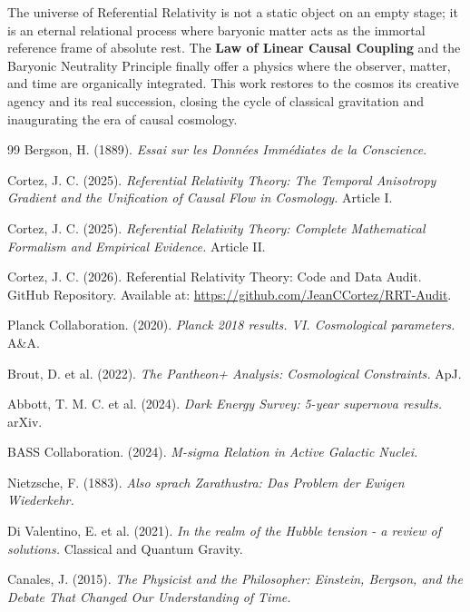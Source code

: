 \documentclass[12pt, a4paper]{article}
\begin{document}
The universe of Referential Relativity is not a static object on an empty stage; it is an eternal relational process where baryonic matter acts as the immortal reference frame of absolute rest. The \textbf{Law of Linear Causal Coupling} and the Baryonic Neutrality Principle finally offer a physics where the observer, matter, and time are organically integrated. This work restores to the cosmos its creative agency and its real succession, closing the cycle of classical gravitation and inaugurating the era of causal cosmology.

\begin{thebibliography}{99}
Bergson, H. (1889). \textit{Essai sur les Données Immédiates de la Conscience}.

Cortez, J. C. (2025). \textit{Referential Relativity Theory: The Temporal Anisotropy Gradient and the Unification of Causal Flow in Cosmology.} Article I.

Cortez, J. C. (2025). \textit{Referential Relativity Theory: Complete Mathematical Formalism and Empirical Evidence.} Article II.

Cortez, J. C. (2026). Referential Relativity Theory: Code and Data Audit. GitHub Repository. Available at: \url{https://github.com/JeanCCortez/RRT-Audit}.

Planck Collaboration. (2020). \textit{Planck 2018 results. VI. Cosmological parameters.} A\&A.

Brout, D. et al. (2022). \textit{The Pantheon+ Analysis: Cosmological Constraints.} ApJ.

Abbott, T. M. C. et al. (2024). \textit{Dark Energy Survey: 5-year supernova results.} arXiv.

BASS Collaboration. (2024). \textit{M-sigma Relation in Active Galactic Nuclei.}

Nietzsche, F. (1883). \textit{Also sprach Zarathustra: Das Problem der Ewigen Wiederkehr.}

Di Valentino, E. et al. (2021). \textit{In the realm of the Hubble tension - a review of solutions.} Classical and Quantum Gravity.

Canales, J. (2015). \textit{The Physicist and the Philosopher: Einstein, Bergson, and the Debate That Changed Our Understanding of Time.}
\end{thebibliography}
\end{document}
